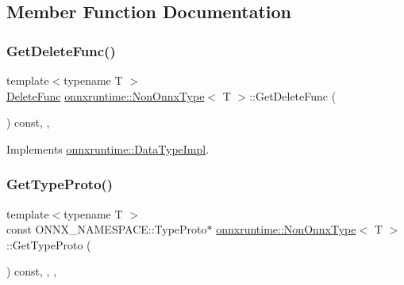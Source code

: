 \subsection{Member Function Documentation}
\mbox{\label{classonnxruntime_1_1NonOnnxType_a98dc87744e3754168fc7fa333401b873}} 
\subsubsection{\texorpdfstring{Get\+Delete\+Func()}{GetDeleteFunc()}}
{\footnotesize\ttfamily template$<$typename T $>$ \\
\mbox{\hyperlink{namespaceonnxruntime_a8dcea0e1aa8476e3d09d5a44a0ca4516}{Delete\+Func}} \mbox{\hyperlink{classonnxruntime_1_1NonOnnxType}{onnxruntime\+::\+Non\+Onnx\+Type}}$<$ T $>$\+::Get\+Delete\+Func (\begin{DoxyParamCaption}{ }\end{DoxyParamCaption}) const\hspace{0.3cm}{\ttfamily [inline]}, {\ttfamily [override]}, {\ttfamily [virtual]}}



Implements \mbox{\hyperlink{classonnxruntime_1_1DataTypeImpl_affe669c89722b1eb854f31d061a60e46}{onnxruntime\+::\+Data\+Type\+Impl}}.

\mbox{\label{classonnxruntime_1_1NonOnnxType_af0dfad01d0ab54a20a68a7cf56a6367f}} 
\subsubsection{\texorpdfstring{Get\+Type\+Proto()}{GetTypeProto()}}
{\footnotesize\ttfamily template$<$typename T $>$ \\
const O\+N\+N\+X\+\_\+\+N\+A\+M\+E\+S\+P\+A\+C\+E\+::\+Type\+Proto$\ast$ \mbox{\hyperlink{classonnxruntime_1_1NonOnnxType}{onnxruntime\+::\+Non\+Onnx\+Type}}$<$ T $>$\+::Get\+Type\+Proto (\begin{DoxyParamCaption}{ }\end{DoxyParamCaption}) const\hspace{0.3cm}{\ttfamily [inline]}, {\ttfamily [final]}, {\ttfamily [override]}, {\ttfamily [virtual]}}



